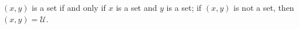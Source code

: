 $(x,y)$ is a set if and only if $x$ is a set and $y$ is a set; if $(x,y)$ is not a set, then $(x,y) = \mathcal{U}$.

